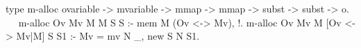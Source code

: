 \begin{elpicode}
  type m-alloc ovariable -> mvariable -> mmap -> mmap -> 
    subst -> subst -> o.                            ~~
  m-alloc Ov Mv M M S S :- mem M (Ov <-> Mv), !.
  m-alloc Ov Mv M [Ov <-> Mv|M] S S1 :- Mv = mv N _, new S N S1.
\end{elpicode}
